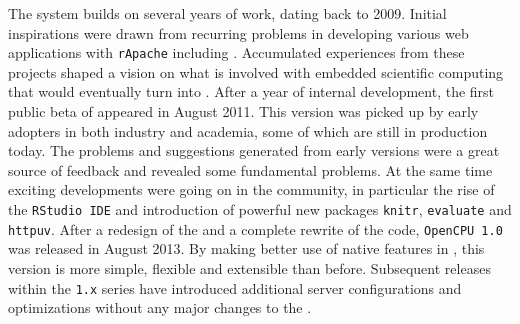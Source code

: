 
The \OpenCPU system builds on several years of work, dating back to 2009. Initial inspirations were drawn from recurring problems in developing various \R web applications with \texttt{rApache} including \cite{van2009stage}. Accumulated experiences from these projects shaped a vision on what is involved with embedded scientific computing that would eventually turn into \OpenCPU. After a year of internal development, the first public beta of \OpenCPU appeared in August 2011. This version was picked up by early adopters in both industry and academia, some of which are still in production today. The problems and suggestions generated from early versions were a great source of feedback and revealed some fundamental problems. At the same time exciting developments were going on in the \R community, in particular the rise of the \texttt{RStudio IDE} and introduction of powerful new \R packages \texttt{knitr}, \texttt{evaluate} and \texttt{httpuv}. After a redesign of the \API and a complete rewrite of the code, \texttt{OpenCPU 1.0} was released in August 2013. By making better use of native features in \HTTP, this version is more simple, flexible and extensible than before. Subsequent releases within the \texttt{1.x} series have introduced additional server configurations and optimizations without any major changes to the \API.




